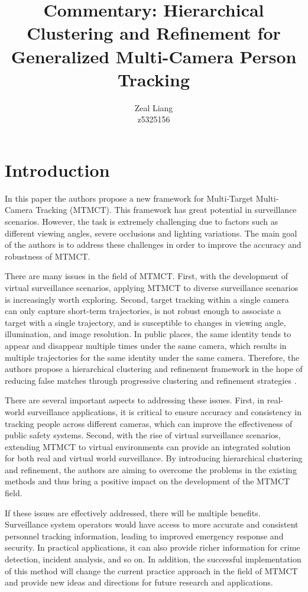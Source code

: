 \documentclass[a4paper,10pt,conference]{COMP9517}
\begin{document}
\title{Commentary: Hierarchical Clustering and Refinement for Generalized Multi-Camera Person Tracking}
\author{
Zeal Liang\\
z5325156
}
\maketitle

\section{Introduction}
In this paper the authors propose a new framework for Multi-Target Multi-Camera Tracking (MTMCT). This framework has great potential in surveillance scenarios. However, the task is extremely challenging due to factors such as different viewing angles, severe occlusions and lighting variations. The main goal of the authors is to address these challenges in order to improve the accuracy and robustness of MTMCT.

There are many issues in the field of MTMCT. First, with the development of virtual surveillance scenarios, applying MTMCT to diverse surveillance scenarios is increasingly worth exploring. Second, target tracking within a single camera can only capture short-term trajectories, is not robust enough to associate a target with a single trajectory, and is susceptible to changes in viewing angle, illumination, and image resolution. In public places, the same identity tends to appear and disappear multiple times under the same camera, which results in multiple trajectories for the same identity under the same camera. Therefore, the authors propose a hierarchical clustering and refinement framework in the hope of reducing false matches through progressive clustering and refinement strategies \cite{Li_2023_CVPR}.

There are several important aspects to addressing these issues. First, in real-world surveillance applications, it is critical to ensure accuracy and consistency in tracking people across different cameras, which can improve the effectiveness of public safety systems. Second, with the rise of virtual surveillance scenarios, extending MTMCT to virtual environments can provide an integrated solution for both real and virtual world surveillance. By introducing hierarchical clustering and refinement, the authors are aiming to overcome the problems in the existing methods and thus bring a positive impact on the development of the MTMCT field.

If these issues are effectively addressed, there will be multiple benefits. Surveillance system operators would have access to more accurate and consistent personnel tracking information, leading to improved emergency response and security. In practical applications, it can also provide richer information for crime detection, incident analysis, and so on. In addition, the successful implementation of this method will change the current practice approach in the field of MTMCT and provide new ideas and directions for future research and applications.
\end{document}
